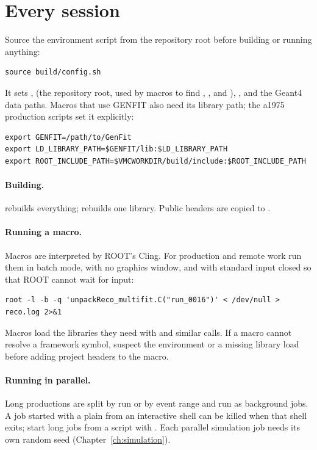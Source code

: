 \section{Every session}

Source the environment script from the repository root before building or running anything:
\begin{verbatim}
source build/config.sh
\end{verbatim}
It sets ,  (the repository root, used by macros to find ,
,  and ), ,  and
the Geant4 data paths. Macros that use GENFIT also need its library path; the a1975 production scripts set it
explicitly:
\begin{verbatim}
export GENFIT=/path/to/GenFit
export LD_LIBRARY_PATH=$GENFIT/lib:$LD_LIBRARY_PATH
export ROOT_INCLUDE_PATH=$VMCWORKDIR/build/include:$ROOT_INCLUDE_PATH
\end{verbatim}

\paragraph{Building.}  rebuilds everything;  rebuilds one
library. Public headers are copied to .

\paragraph{Running a macro.} Macros are interpreted by ROOT's Cling. For production and remote work run them in
batch mode, with no graphics window, and with standard input closed so that ROOT cannot wait for input:
\begin{verbatim}
root -l -b -q 'unpackReco_multifit.C("run_0016")' < /dev/null > reco.log 2>&1
\end{verbatim}
Macros load the libraries they need with  and similar calls. If a
macro cannot resolve a framework symbol, suspect the environment or a missing library load before adding project
headers to the macro.

\paragraph{Running in parallel.} Long productions are split by run or by event range and run as background jobs. A
job started with a plain \code{\&} from an interactive shell can be killed when that shell exits; start long jobs
from a script with . Each parallel simulation job needs its own random seed (Chapter~\ref{ch:simulation}).

